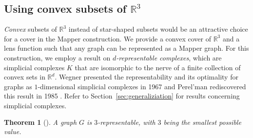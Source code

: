 \documentclass[reqno,oneside,11pt]{amsart}
\newtheorem{theorem}{Theorem}[section]
\theoremstyle{definition}
\theoremstyle{remark}
\def\R{\mathbb{R}}
\begin{document}
\subsection{Using convex subsets of $\R^3$}
\label{sec:convex-subsets} \emph{Convex} subsets of $\R^3$ instead of star-shaped subsets would be an attractive choice for a cover in the Mapper construction. We provide a convex cover of $\R^3$ and a lens function such that any graph can be represented as a Mapper graph. For this construction, we employ a result on \emph{$d$-representable complexes}, which are simplicial complexes $K$ that are isomorphic to the nerve of a finite collection of convex sets in $\R^d$. Wegner presented the representability and its optimality for graphs as $1$-dimensional simplicial complexes in 1967 \cite{wegner1967eigenschaften} and Perel'man rediscovered this result in 1985 \cite{perelman85realization}. Refer to Section~\ref{sec:generaliziation} for results concerning
simplicial complexes.
\begin{theorem}[\cite{wegner1967eigenschaften}] A graph $G$ is $3$-representable, with $3$ being the smallest possible value.
\label{theorem:representability}
\end{theorem}
%
%

%
%

%

%
%
%

\end{document}
